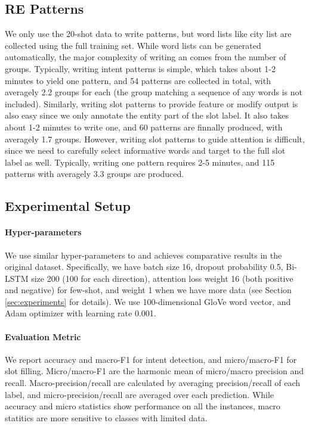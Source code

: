 \subsection{RE Patterns}
\label{re_in_exp}
We only use the 20-shot data to write \RE patterns, but word lists like city list are collected using the full training set. 
While word lists can be generated automatically, the major complexity of writing an \RE comes from the number of groups.
Typically, writing intent patterns is simple, which takes about 1-2 minutes to yield one pattern, and 54 patterns are collected in total, with averagely 2.2 groups for each \RE (the group matching a sequence of any words is not included). 
Similarly, writing slot patterns to provide feature or modify output is also easy since we only annotate the entity part of the slot label. It also takes about 1-2 minutes to write one, and 60 patterns are finnally produced, with averagely 1.7 groups.
However, writing slot patterns to guide attention is difficult, since we need to carefully select informative words and target to the full slot label as well. Typically, writing one pattern requires 2-5 minutes, and 115 patterns with averagely 3.3 groups are produced.


\subsection{Experimental Setup}
\paragraph{Hyper-parameters}
We use similar hyper-parameters to \cite{liu2016attention} and achieves comparative results in the original dataset. Specifically, we have batch size 16, dropout probability 0.5, Bi-LSTM size 200 (100 for each direction), attention loss weight 16 (both positive and negative) for few-shot, and weight 1 when we have more data (see Section \ref{sec:experiments} for details). We use 100-dimensional GloVe \cite{pennington2014glove} word vector, and Adam optimizer \cite{kingma2014adam} with learning rate 0.001.

\paragraph{Evaluation Metric}
We report accuracy and macro-F1 for intent detection, and micro/macro-F1 for slot filling.
Micro/macro-F1 are the harmonic mean of micro/macro precision and recall.
Macro-precision/recall are calculated by averaging precision/recall of each label, and micro-precision/recall are averaged over each prediction. 
While accuracy and micro statistics show performance on all the instances, macro statitics are more sensitive to classes with limited data.

